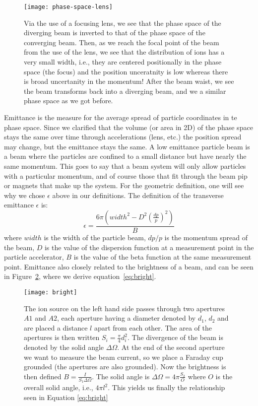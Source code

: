 \begin{figure}
	\centering
	\texttt{[image: phase-space-lens]}
	\caption{Via the use of a focusing lens, we see that the phase space of the diverging beam is inverted to that of the phase space of the converging beam. Then, as we reach the focal point of the beam from the use of the lens, we see that the distribution of ions has a very small width, i.e., they are centered positionally in the phase space (the focus) and the position unceratnity is low whereas there is broad uncertanity in the momentum! After the beam waist, we see the beam transforms back into a diverging beam, and we a similar phase space as we got before.  }
	\label{fig:PSib}
\end{figure}
Emittance is the measure for the average spread of particle coordinates in te phase space.
Since we clarified that the volume (or area in 2D) of the phase space stays the same over time through accelerations (lens, etc.) the position spread may change, but the emittance stays the same.
A low emittance particle beam is a beam where the particles are confined to a small distance but have nearly the same momentum.
This goes to say that a beam system will only allow particles with a particular momentum, and of course those that fit through the beam pip or magnets that make up the system.
For the geometric definition, one will see why we chose $\epsilon$ above in our definitions.
The  definition of the transverse emittance $\epsilon$ is:
\[ \epsilon = \frac{6\pi \left(width^2 - D^2 \left(\frac{dp}{p}\right)^2\right)}{B}\]
where $width$ is the width of the particle beam, $dp/p$ is the momentum spread of the beam, $D$ is the value of the dispersion function at a measurement point in the particle accelerator, $B$ is the value of the beta function at the same measurement point.
Emittance also closely related to the brightness of a beam, and can be seen in Figure~\ref{fig:bright}, where we derive equation~\ref{eq:bright}.

\begin{figure}
	\centering
	\texttt{[image: bright]}
	\caption{The ion source on the left hand side passes through two apertures $A1$ and $A2$, each aperture having a diameter denoted by $d_1$, $d_2$ and are placed a distance $l$ apart from each other. The area of the apertures is then written $S_i = \frac{\pi}{4}d_i^2$. The divergence of the beam is denoted by the solid angle $\Delta \Omega$. At the end of the second aperture we want to measure the beam current, so we place a Faraday cup grounded (the apertures are also grounded). Now the brightness is then defined $B = \frac{I}{S_1 \Delta \Omega}$. The solid angle is $\Delta \Omega = 4\pi \frac{S_2}{O}$ where  $O$ is the overall solid angle, i.e., $4\pi l^2$. This yields us finally the relationship seen in Equation \ref{eq:bright}}
	\label{fig:bright}
\end{figure}


